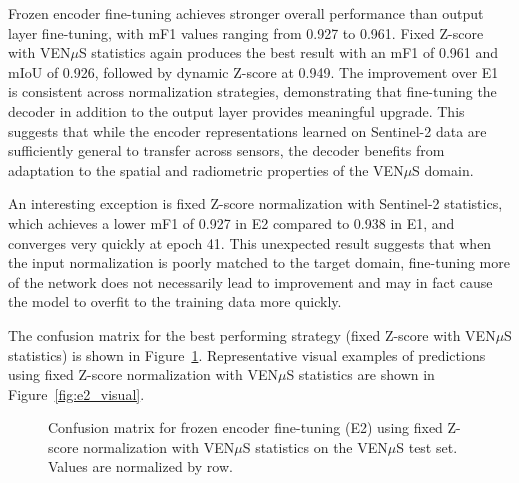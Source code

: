 Frozen encoder fine-tuning achieves stronger overall performance than output layer fine-tuning, with mF1 values ranging from 0.927 to 0.961. Fixed Z-score with VEN$\mu$S statistics again produces the best result with an mF1 of 0.961 and mIoU of 0.926, followed by dynamic Z-score at 0.949. The improvement over E1 is consistent across normalization strategies, demonstrating that fine-tuning the decoder in addition to the output layer provides meaningful upgrade. This suggests that while the encoder representations learned on Sentinel-2 data are sufficiently general to transfer across sensors, the decoder benefits from adaptation to the spatial and radiometric properties of the VEN$\mu$S domain.

An interesting exception is fixed Z-score normalization with Sentinel-2 statistics, which achieves a lower mF1 of 0.927 in E2 compared to 0.938 in E1, and converges very quickly at epoch 41. This unexpected result suggests that when the input normalization is poorly matched to the target domain, fine-tuning more of the network does not necessarily lead to improvement and may in fact cause the model to overfit to the training data more quickly.

The confusion matrix for the best performing strategy (fixed Z-score with VEN$\mu$S statistics) is shown in Figure~\ref{fig:e2_confusion}. Representative visual examples of predictions using fixed Z-score normalization with VEN$\mu$S statistics are shown in Figure~\ref{fig:e2_visual}.

\begin{figure}[h]
\centering
{}
\caption[Confusion matrix for frozen encoder fine-tuning using fixed Z-score normalization with VEN$\mu$S statistics.]{Confusion matrix for frozen encoder 
fine-tuning (E2) using fixed Z-score normalization with VEN$\mu$S statistics on the VEN$\mu$S test set. Values are normalized by row.}
\label{fig:e2_confusion}
\end{figure}


